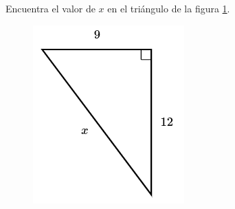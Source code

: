 Encuentra el valor de $x$ en el triángulo de la figura \ref{fig:lados_pitagoras_04}.

\begin{minipage}[t][][t]{0.35\textwidth}
    \begin{figure}[H]
        \centering
        \includegraphics[width=0.9\linewidth]{../images/lados_pitagoras_04.png}
        \caption{}
        \label{fig:lados_pitagoras_04}
    \end{figure}
\end{minipage}\hfill
\begin{minipage}[t][][t]{0.6\textwidth}
    \begin{solutionbox}{9cm}

    \end{solutionbox}
\end{minipage}

